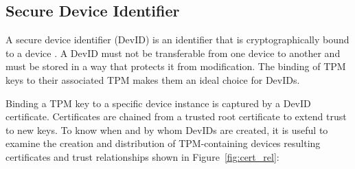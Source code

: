 \documentclass[runningheads]{llncs}
\begin{document}

\subsection{Secure Device Identifier}
A secure device identifier (DevID) is an identifier that is
cryptographically bound to a device \citep{DevIDSpec-IEEE}. A DevID
must not be transferable from one device to another and must be stored
in a way that protects it from modification. The binding of TPM keys
to their associated TPM makes them an ideal choice for DevIDs.

Binding a TPM key to a specific device instance is captured by a DevID
certificate. Certificates are chained from a trusted root certificate
to extend trust to new keys. To know when and by whom DevIDs are
created, it is useful to examine the creation and distribution of
TPM-containing devices resulting certificates and trust relationships
shown in Figure~\ref{fig:cert_rel}:


\end{document}
